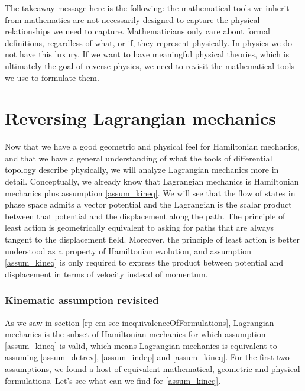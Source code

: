 The takeaway message here is the following: the mathematical tools we inherit from mathematics are not necessarily designed to capture the physical relationships we need to capture. Mathematicians only care about formal definitions, regardless of what, or if, they represent physically. In physics we do not have this luxury. If we want to have meaningful physical theories, which is ultimately the goal of reverse physics, we need to revisit the mathematical tools we use to formulate them.


\section{Reversing Lagrangian mechanics}

Now that we have a good geometric and physical feel for Hamiltonian mechanics, and that we have a general understanding of what the tools of differential topology describe physically, we will analyze Lagrangian mechanics more in detail. Conceptually, we already know that Lagrangian mechanics is Hamiltonian mechanics plus assumption \ref{assum_kineq}. We will see that the flow of states in phase space admits a vector potential and the Lagrangian is the scalar product between that potential and the displacement along the path. The principle of least action is geometrically equivalent to asking for paths that are always tangent to the displacement field. Moreover, the principle of least action is better understood as a property of Hamiltonian evolution, and assumption \ref{assum_kineq} is only required to express the product between potential and displacement in terms of velocity instead of momentum.

\subsubsection{Kinematic assumption revisited}

As we saw in section \ref{rp-cm-sec-inequivalenceOfFormulations}, Lagrangian mechanics is the subset of Hamiltonian mechanics for which assumption \ref{assum_kineq} is valid, which means Lagrangian mechanics is equivalent to assuming \ref{assum_detrev}, \ref{assum_indep} and \ref{assum_kineq}. For the first two assumptions, we found a host of equivalent mathematical, geometric and physical formulations. Let's see what can we find for \ref{assum_kineq}.

